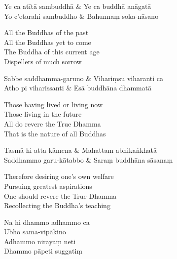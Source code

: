 \begin{twochants}
  Ye ca atītā sambuddhā & Ye ca buddhā anāgatā \\
  Yo c'etarahi sambuddho & Bahunnaṃ soka-nāsano \\
\end{twochants}

\begin{english}
  All the Buddhas of the past\\
  All the Buddhas yet to come\\
  The Buddha of this current age\\
  Dispellers of much sorrow
\end{english}

\begin{twochants}
  Sabbe saddhamma-garuno & Vihariṃsu viharanti ca\\
  Atho pi viharissanti & Esā buddhāna dhammatā\\
\end{twochants}

\begin{english}
  Those having lived or living now\\
  Those living in the future\\
  All do revere the True Dhamma\\
  That is the nature of all Buddhas
\end{english}

\begin{twochants}
  Tasmā hi atta-kāmena & Mahattam-abhikaṅkhatā\\
  Saddhammo garu-kātabbo & Saraṃ buddhāna sāsanaṃ\\
\end{twochants}

\begin{english}
  Therefore desiring one's own welfare\\
  Pursuing greatest aspirations\\
  One should revere the True Dhamma\\
  Recollecting the Buddha's teaching
\end{english}


\begin{paritta}
  Na hi dhammo adhammo ca\\
  Ubho sama-vipākino\\
  Adhammo nirayaṃ neti\\
  Dhammo pāpeti suggatiṃ
\end{paritta}

